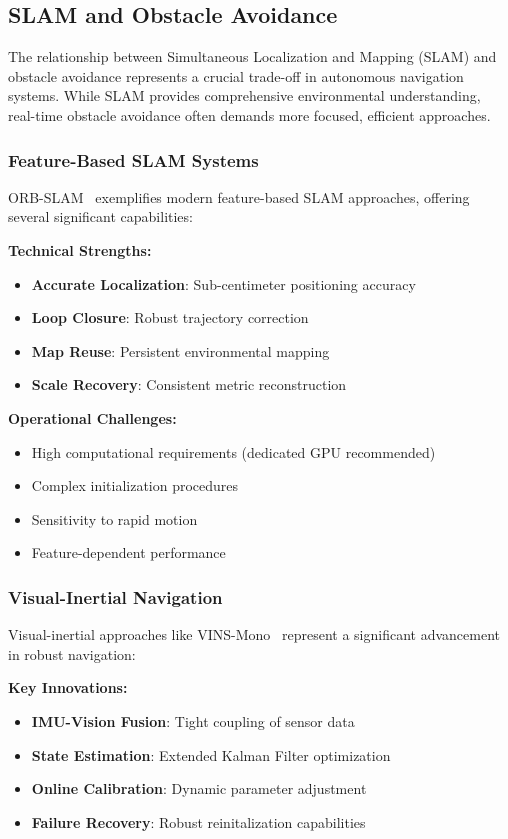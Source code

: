 \documentclass[12pt,oneside]{book}
\begin{document}
\subsection{SLAM and Obstacle Avoidance}

The relationship between Simultaneous Localization and Mapping (SLAM) and obstacle avoidance represents a crucial trade-off in autonomous navigation systems. While SLAM provides comprehensive environmental understanding, real-time obstacle avoidance often demands more focused, efficient approaches.

\subsubsection{Feature-Based SLAM Systems}
ORB-SLAM~\cite{mur2015orb} exemplifies modern feature-based SLAM approaches, offering several significant capabilities:

\textbf{Technical Strengths:}
\begin{itemize}
    \item \textbf{Accurate Localization}: Sub-centimeter positioning accuracy
    \item \textbf{Loop Closure}: Robust trajectory correction
    \item \textbf{Map Reuse}: Persistent environmental mapping
    \item \textbf{Scale Recovery}: Consistent metric reconstruction
\end{itemize}

\textbf{Operational Challenges:}
\begin{itemize}
    \item High computational requirements (dedicated GPU recommended)
    \item Complex initialization procedures
    \item Sensitivity to rapid motion
    \item Feature-dependent performance
\end{itemize}

\subsubsection{Visual-Inertial Navigation}
Visual-inertial approaches like VINS-Mono~\cite{qin2018vins} represent a significant advancement in robust navigation:

\textbf{Key Innovations:}
\begin{itemize}
    \item \textbf{IMU-Vision Fusion}: Tight coupling of sensor data
    \item \textbf{State Estimation}: Extended Kalman Filter optimization
    \item \textbf{Online Calibration}: Dynamic parameter adjustment
    \item \textbf{Failure Recovery}: Robust reinitalization capabilities
\end{itemize}
\end{document}
